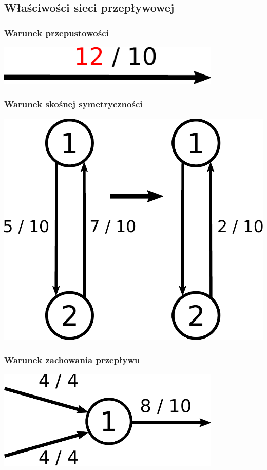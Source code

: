 \documentclass{beamer}
\begin{document}
\subsection{Właściwości sieci przepływowej}
\begin{frame}\frametitle{Warunek przepustowości}
	\begin{center}
		\includegraphics[width=0.8\textwidth]{./img/warunek_1}
	\end{center}
\end{frame}
\begin{frame}\frametitle{Warunek skośnej symetryczności}
	\begin{center}
		\includegraphics[width=0.8\textheight]{./img/warunek_2}
	\end{center}
\end{frame}
\begin{frame}\frametitle{Warunek zachowania przepływu}
	\begin{center}
		\includegraphics[width=0.8\textwidth]{./img/warunek_3}
	\end{center}
\end{frame}
\end{document}

